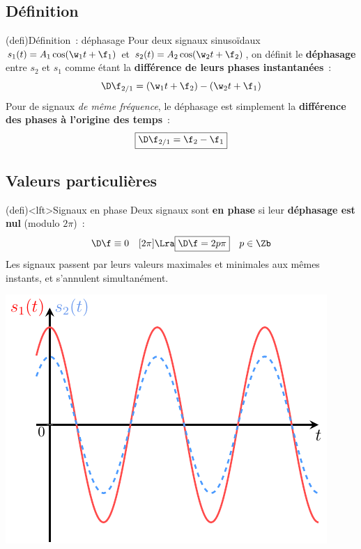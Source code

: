 \documentclass[../../main/main.tex]{subfiles}
\begin{document}
\subsection{Définition}
\begin{tcb}[width=\linewidth](defi){Définition~: déphasage}
	Pour deux signaux sinusoïdaux $s_1(t) = A_1\cos(\w_1t+\f_1)$ et $s_2(t) =
		A_2\cos(\w_2t+\f_2)$, on définit le \textbf{déphasage} entre $s_2$ et $s_1$
	comme étant la \textbf{différence de leurs phases instantanées}~:
	\[\D\f_{2/1} = (\w_1t + \f_2) - (\w_2t+\f_1)\]
	Pour de signaux \textit{de même fréquence}, le déphasage est simplement la
	\textbf{différence des phases à l'origine des temps}~:
	\[\boxed{\D\f_{2/1} = \f_2 - \f_1}\]
\end{tcb}

\subsection{Valeurs particulières}
\begin{tcb}[sidebyside, righthand ratio=.25](defi)<lft>{Signaux en phase}
	Deux signaux sont \textbf{en phase} si leur \textbf{déphasage est nul}
	(modulo $2\pi$)~:
	\[
		\D\f \equiv 0\quad[2\pi]
		\Lra
		\boxed{\D\f = 2p\pi} \quad p \in \Zb
	\]
	Les signaux passent par leurs valeurs maximales et minimales aux mêmes
	instants, et s'annulent simultanément.
	\tcblower
	\begin{center}
		\includegraphics[width=\linewidth]{dfeq0.pdf}
	\end{center}
\end{tcb}
\end{document}
